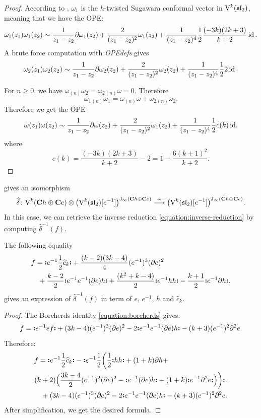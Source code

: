 \begin{proof}
	According to \cite[Example 1.4]{kac2003quantum}, $\omega_1$ is the $h$-twisted Sugawara conformal vector in $\mathrm V^k(\mathfrak{sl}_2)$, meaning that we have the OPE:
	\[ \omega_1(z_1) \omega_1(z_2) \sim \frac{1}{z_1 - z_2} \partial \omega_1(z_2) + \frac{2}{(z_1 - z_2)^2} \omega_1(z_2) + \frac{1}{(z_1 - z_2)^4} \frac{1}{2} \frac{(-3 k)(2 k + 3)}{k + 2} \operatorname{id}. \] 
	A brute force computation with \emph{OPEdefs} gives 
	\[ \omega_2(z_1) \omega_2(z_2) \sim \frac{1}{z_1 - z_2} \partial \omega_2(z_2) + \frac{2}{(z_1 - z_2)^2} \omega_2(z_2) + \frac{1}{(z_1 - z_2)^4} \frac{1}{2} 2 \operatorname{id}. \]
	
	For $n \geqslant 0$, we have $\omega_{(n)} \omega_2 = \omega_2{}_{(n)} \omega = 0$. Therefore
	\[ \omega_1{}_{(n)} \omega_1 = \omega_{(n)} \omega + \omega_2{}_{(n)} \omega_2. \]
	Therefore we get the OPE
	\[ \omega(z_1) \omega(z_2) \sim \frac{1}{z_1 - z_2} \partial \omega(z_2) + \frac{2}{(z_1 - z_2)^2} \omega_1(z_2) + \frac{1}{(z_1 - z_2)^4} \frac{1}{2} c(k) \operatorname{id}, \]
	where
	\[ c(k) = \frac{(-3 k)(2 k + 3)}{k + 2} - 2 = 1 - \frac{6 (k + 1)^2}{k + 2}. \]
\end{proof}


 gives an isomorphism
\[ \widehat{\delta} \colon  \mathrm V^k(\mathbf{C} h \oplus \mathbf{C} e) \otimes  \big(\mathrm V^k(\mathfrak{sl}_2)[e^{-1}]\big)^{\mathrm{J}_\infty(\mathbf{C} h \oplus \mathbf{C} e)} \overset{\sim}{\longrightarrow} \big(\mathrm V^k(\mathfrak{sl}_2)[e^{-1}]\big)^{\mathrm{J}_\infty(\mathbf{C} h \oplus \mathbf{C} e)}. \]
In this case, we can retrieve the inverse reduction \eqref{equation:inverse-reduction} by computing $\widehat{\delta}^{-1}(f)$.

\begin{proposition} \label{proposition:computation-f}
	The following equality
	\[ \begin{multlined}
		f = \NO{e^{-1} \frac{1}{2} \widehat{c}_k} + \frac{(k - 2)(3 k -4)}{4} (e^{-1})^3 (\partial e)^2 \\ + \frac{k - 2}{2} \NO{e^{-1} e^{-1} (\partial e) h} + \frac{(k^2 + k - 4)}{2} \NO{e^{-1} h h} - \frac{k + 1}{2} \NO{e^{-1} \partial h}.
	\end{multlined} \]
	gives an expression of $\widehat{\delta}^{-1}(f)$ in term of $e$, $e^{-1}$, $h$ and $\widehat{c}_k$. 
\end{proposition}

\begin{proof}
	The Borcherds identity \eqref{equation:borcherds} gives:
	\[ f = \mathopen{\boldsymbol{\vcentcolon}}e^{-1} e f\mathclose{\boldsymbol{\vcentcolon}} + (3k - 4) (e^{-1})^3 (\partial e)^2 - 2 \mathopen{\boldsymbol{\vcentcolon}}e^{-1} e^{-1} (\partial e) h\mathclose{\boldsymbol{\vcentcolon}} - (k + 3) (e^{-1})^2 \partial^2 e. \]
	Therefore:
	\[ \begin{multlined}
		f = \NO{e^{-1} \frac{1}{2} \widehat{c}_k}  - \NO{e^{-1} \frac{1}{2} \bigg(\frac{1}{2} \NO{h h} + (1 + k) \partial h + \\ (k + 2) \Big(\frac{3 k - 4}{2} (e^{-1})^2 (\partial e)^2  -  \NO{e^{-1} (\partial e) h} - (1+k) \NO{e^{-1} \partial^2 e}\Big)\bigg)}. \\  
		+ (3k - 4) (e^{-1})^3 (\partial e)^2 - 2 \NO{e^{-1} e^{-1} (\partial e) h} - (k + 3) (e^{-1})^2 \partial^2 e. 
	\end{multlined} \]
	After simplification, we get the desired formula.
	
\end{proof}
